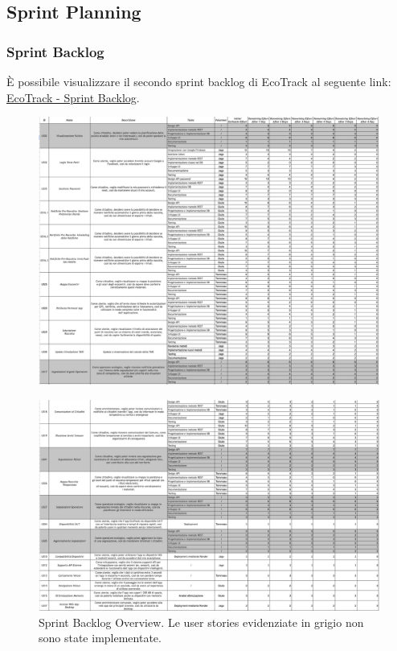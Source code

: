 \subsection{Sprint Planning}
\subsubsection{Sprint Backlog}
È possibile visualizzare il secondo sprint backlog di EcoTrack al seguente link: \href{https://docs.google.com/spreadsheets/d/1UYSNiXJVttFC2hsekku7MCvBMyUbau9QfrwKCSSBOCM/edit?usp=sharing}{EcoTrack - Sprint Backlog}.

\begin{figure} [H]
    \centering
    \includegraphics[width=1\linewidth]{D4-G1//Img/Screenshot 2025-06-10 at 14.14.02.png}
    \label{fig:enter-label}
\end{figure}

\begin{figure} [H]
    \centering
    \includegraphics[width=1\linewidth]{D4-G1//Img/Screenshot 2025-06-10 at 14.14.44.png}
    \caption{Sprint Backlog Overview. Le user stories evidenziate in grigio non sono state implementate.}
    \label{fig:enter-label}
\end{figure}


